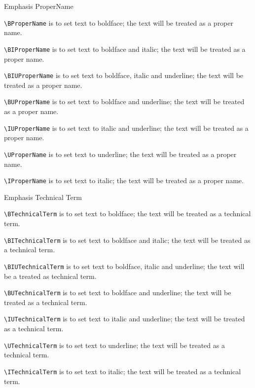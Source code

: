 \documentclass[12pt,Bold,letterpaper,TexShade]{mcgilletdclass}
\numberwithin{equation}{section}
\begin{document}
\begin{BulletList}
		\item{Emphasis ProperName}
		\begin{romanList}
			\item{ \verb=\BProperName= is to set text to boldface; the text will be treated as a proper name}.
			\item{ \verb=\BIProperName= is to set text to boldface and italic; the text will be treated as a proper name}.
			\item{ \verb=\BIUProperName= is to set text to boldface, italic and underline; the text will be treated as a proper name}.
			\item{ \verb=\BUProperName= is to set text to boldface and underline; the text will be treated as a proper name}.
			\item{ \verb=\IUProperName= is to set text to italic and underline; the text will be treated as a proper name}.
			\item{ \verb=\UProperName= is to set text to underline; the text will be treated as a proper name}.
			\item{ \verb=\IProperName= is to set text to italic; the text will be treated as a proper name}.
		\end{romanList}
		\item{Emphasis Technical Term}
		\begin{romanList}
			\item{ \verb=\BTechnicalTerm= is to set text to boldface; the text will be treated as a technical term}.
			\item{ \verb=\BITechnicalTerm= is to set text to boldface and italic; the text will be treated as a technical term}.
			\item{ \verb=\BIUTechnicalTerm= is to set text to boldface, italic and underline; the text will be a treated as technical term}.
			\item{ \verb=\BUTechnicalTerm= is to set text to boldface and underline; the text will be treated as a technical term}.
			\item{ \verb=\IUTechnicalTerm= is to set text to italic and underline; the text will be treated as a technical term}.
			\item{ \verb=\UTechnicalTerm= is to set text to underline; the text will be treated as a technical term}.
			\item{ \verb=\ITechnicalTerm= is to set text to italic; the text will be treated as a technical term}.
		\end{romanList}


\end{BulletList}
\end{document}
